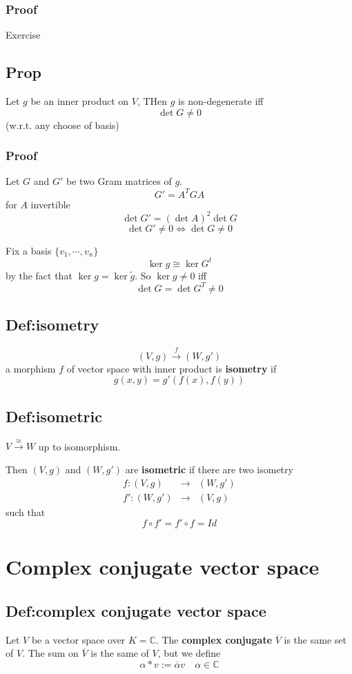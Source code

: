 \documentclass{book}
\begin{document}
\subsection*{Proof}Exercise
\section{Prop}
Let $g$ be an inner product on $V$, THen $g$ is non-degenerate iff $$\det G\neq 0$$
(w.r.t. any choose of basis)
\subsection*{Proof}
Let $G$ and $G'$ be two Gram matrices of $g$. $$G'=A^TGA$$
for $A$ invertible
$$\det G'=(\det A)^2\det G$$
$$\det{G'}\neq0\Leftrightarrow\det G\neq0$$

Fix a basis $\{v_1,\cdots,v_n\}$$$\ker g\cong\ker G^t$$ by the fact that $\ker g=\ker \tilde{g}$. So $\ker g\neq0$ iff $$\det G=\det G^T\neq0$$


\section{Def:isometry}
$$(V,g)\stackrel{f}\rightarrow(W,g')$$
a morphism $f$ of vector space with inner product is \textbf{isometry} if $$g(x,y)=g'(f(x),f(y))$$
\section{Def:isometric}
$V\stackrel{\cong}\rightarrow W$ up to isomorphism.

Then $(V,g)$ and $(W,g')$ are \textbf{isometric} if there are two isometry
$$\begin{aligned}
    f:(V,g)&\rightarrow&(W,g')\\
    f':(W,g')&\rightarrow&(V,g)
\end{aligned}$$
such that
$$f\circ f'=f'\circ f=Id$$
\chapter{Complex conjugate vector space}
\section{Def:complex conjugate vector space}
Let $V$ be a vector space over $K=\mathbb{C}$. The \textbf{complex conjugate} $\overline{V}$ is the same set of $V$. The sum on $\overline{V}$ is the same of $V$, but we define $$\alpha*v:=\overline{\alpha}v\quad \alpha\in \mathbb{C}$$
\end{document}
